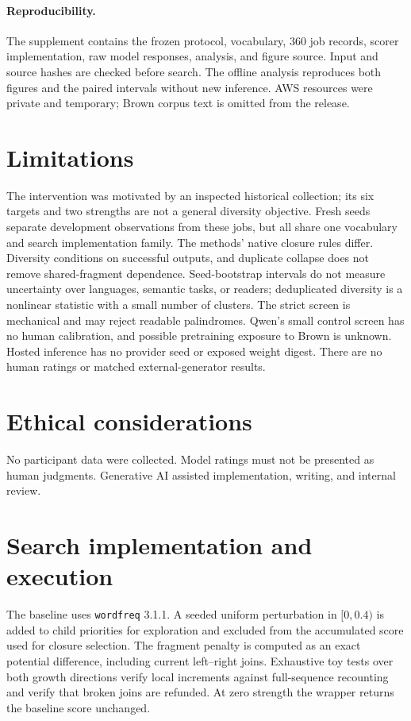 \documentclass[11pt]{article}
\newcommand{\code}[1]{\texttt{#1}}
\begin{document}
\paragraph{Reproducibility.}
The supplement contains the frozen protocol, vocabulary, 360 job records, scorer implementation, raw model responses, analysis, and figure source. Input and source hashes are checked before search. The offline analysis reproduces both figures and the paired intervals without new inference. AWS resources were private and temporary; Brown corpus text is omitted from the release.

\section*{Limitations}
The intervention was motivated by an inspected historical collection; its six targets and two strengths are not a general diversity objective. Fresh seeds separate development observations from these jobs, but all share one vocabulary and search implementation family. The methods' native closure rules differ. Diversity conditions on successful outputs, and duplicate collapse does not remove shared-fragment dependence. Seed-bootstrap intervals do not measure uncertainty over languages, semantic tasks, or readers; deduplicated diversity is a nonlinear statistic with a small number of clusters. The strict screen is mechanical and may reject readable palindromes. Qwen's small control screen has no human calibration, and possible pretraining exposure to Brown is unknown. Hosted inference has no provider seed or exposed weight digest. There are no human ratings or matched external-generator results.

\section*{Ethical considerations}
No participant data were collected. Model ratings must not be presented as human judgments. Generative AI assisted implementation, writing, and internal review.


\appendix
\section{Search implementation and execution}
The baseline uses \code{wordfreq} 3.1.1. A seeded uniform perturbation in $[0,0.4)$ is added to child priorities for exploration and excluded from the accumulated score used for closure selection. The fragment penalty is computed as an exact potential difference, including current left--right joins. Exhaustive toy tests over both growth directions verify local increments against full-sequence recounting and verify that broken joins are refunded. At zero strength the wrapper returns the baseline score unchanged.
\end{document}
